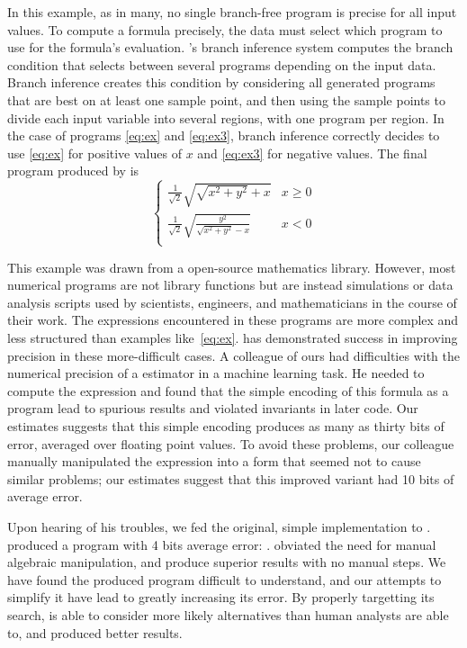 \documentclass[paper.tex]{subfiles}
\begin{document}
In this example, as in many,
  no single branch-free program is precise for all input values.
To compute a formula precisely, the data must select
  which program to use for the formula's evaluation.
\casio's branch inference system
  computes the branch condition
  that selects between several programs depending on the input data.
Branch inference creates this condition
  by considering all generated programs
  that are best on at least one sample point,
  and then using the sample points to divide each input variable
  into several regions, with one program per region.
In the case of programs \eqref{eq:ex} and \eqref{eq:ex3},
  branch inference correctly decides
  to use \eqref{eq:ex} for positive values of $x$
  and \eqref{eq:ex3} for negative values.
The final program produced by \casio is
\[
\begin{cases}
  \frac1{\sqrt2} \sqrt{\sqrt{x^2 + y^2} + x} & x \ge 0 \\
  \frac1{\sqrt2} \sqrt{\frac{y^2}{\sqrt{x^2 + y^2} - x}} & x < 0 \\
\end{cases}
\]

This example was drawn from a open-source mathematics library.
However, most numerical programs are not library functions
  but are instead simulations or data analysis scripts
  used by scientists, engineers, and mathematicians
  in the course of their work.
The expressions encountered in these programs are more complex
  and less structured than examples like~\eqref{eq:ex}.
\casio has demonstrated success in improving precision
  in these more-difficult cases.
A colleague of ours had difficulties with the numerical precision
  of a estimator in a machine learning task.
He needed to compute the expression
  and found that the simple encoding of this formula as a program
  lead to spurious results and violated invariants in later code.
Our estimates suggests that this simple encoding produces
  as many as thirty bits of error, averaged over floating point values.
To avoid these problems,
  our colleague manually manipulated the expression
  into a form that seemed not to cause similar problems;
  our estimates suggest that this improved variant
  had 10 bits of average error.

Upon hearing of his troubles,
  we fed the original, simple implementation to \casio.
\casio produced a program with 4 bits average error:
  .
\casio obviated the need for manual algebraic manipulation,
  and produce superior results with no manual steps.
We have found the produced program difficult to understand,
  and our attempts to simplify it
  have lead to greatly increasing its error.
By properly targetting its search,
  \casio is able to consider more likely alternatives
  than human analysts are able to,
  and produced better results.
\end{document}
